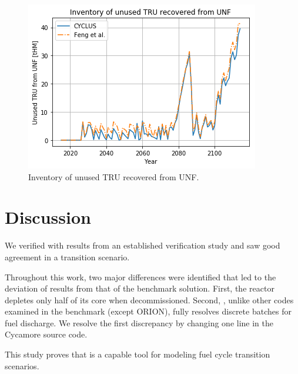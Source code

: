 \begin{figure}[htbp!]
	\begin{center}
		\includegraphics[scale=0.7]{./images/results_18/tru.png}
	\end{center}
	\caption{Inventory of unused \gls{TRU} recovered from \gls{UNF}.}
	\label{fig:tru}
\end{figure}

\section{Discussion}

We verified \Cyclus with results from an established
verification study and saw good agreement
in a transition scenario.

Throughout this work, two major differences were identified
that led to the deviation
of \Cyclus results from that of the benchmark solution. First,
the \Cycamore reactor depletes only half of its core
when decommissioned. Second, \Cyclus, unlike other
codes examined in the benchmark (except ORION), fully resolves
discrete batches for fuel discharge.
We resolve the first discrepancy by changing one line in the Cycamore source code.

This study proves that \Cyclus is a capable tool for modeling
fuel cycle transition scenarios.